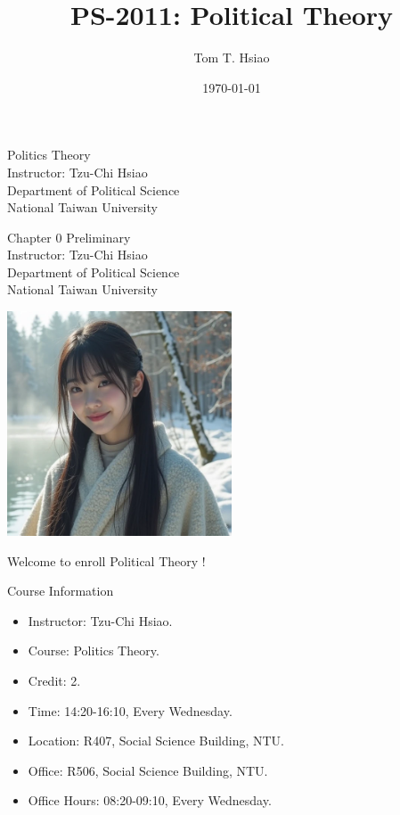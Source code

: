 \documentclass{beamer}
\title{PS-2011: Political Theory}
\author{Tom T. Hsiao}
\date{\today}
\begin{document}
\begin{frame}
\begin{center}
\Large{Politics Theory} \\
\vspace{3em}
\normalsize{Instructor: Tzu-Chi Hsiao} \\
\vspace{3em}
\small{Department of Political Science} \\
\vspace{1em}
\small{National Taiwan University}
\end{center}
\end{frame}
\begin{frame}
\begin{center}
\Large{Chapter 0 Preliminary} \\
\vspace{3em}
\normalsize{Instructor: Tzu-Chi Hsiao} \\
\vspace{3em}
\small{Department of Political Science} \\
\vspace{1em}
\small{National Taiwan University} \\
\end{center}
\end{frame}
\begin{frame}{}
\begin{center}
\includegraphics[width=0.5\textwidth]{instructor.png}
\end{center}
\vspace{1em}
\begin{center}
\Large{Welcome to enroll Political Theory !}
\end{center}
\end{frame}
\begin{frame}{Course Information}
\begin{itemize}
\item Instructor: Tzu-Chi Hsiao.
\item Course: Politics Theory.
\item Credit: 2.
\item Time: 14:20-16:10, Every Wednesday.
\item Location: R407, Social Science Building, NTU. 
\item Office: R506, Social Science Building, NTU.
\item Office Hours: 08:20-09:10, Every Wednesday.
\end{itemize}
\end{frame}
\end{document}
